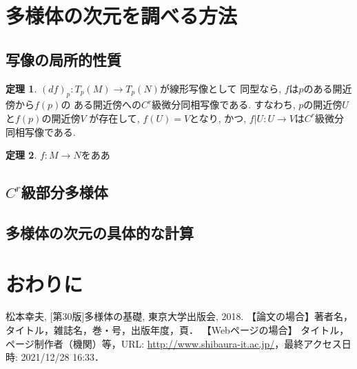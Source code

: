 \documentclass[a4j,12pt]{jarticle}
\theoremstyle{definition}
\newtheorem{theorem}{定理}[section]
\begin{document}
\section{多様体の次元を調べる方法}
\subsection{写像の局所的性質}
\begin{theorem}
    $(df)_p:T_p(M)\to T_p(N)$が線形写像として
    同型なら, $f$は$p$のある開近傍から$f(p)$の
    ある開近傍への$C^r$級微分同相写像である. 
    すなわち, $p$の開近傍$U$と$f(p)$の開近傍$V$
    が存在して, $f(U)=V$となり, かつ, 
    $f|U:U \to V$は$C^r$級微分同相写像である. 
\end{theorem}
\begin{theorem}
    $f:M\to N$をああ
\end{theorem}
\subsection{$C^r$級部分多様体}
\subsection{多様体の次元の具体的な計算}
\newpage
%
\section{おわりに}
\newpage
\begin{thebibliography}{99}
 松本幸夫, [第30版]多様体の基礎, 東京大学出版会, 2018.
【論文の場合】著者名，タイトル，雑誌名，巻・号，出版年度，頁．
【Webページの場合】 タイトル，ページ制作者（機関）等，URL: \url{http://www.shibaura-it.ac.jp/}，最終アクセス日時: 2021/12/28 16:33．
\end{thebibliography}
\end{document}
